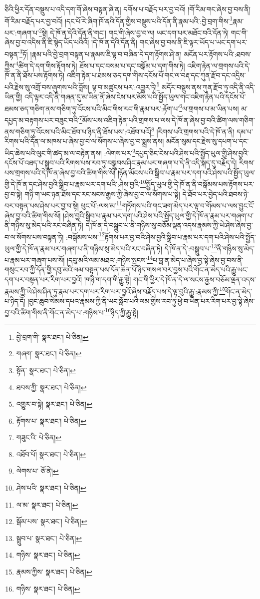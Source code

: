 ཅིའི་ཕྱིར་དོན་བསྡུས་པ་འདི་དག་གོ་ཞེས་བསྟན་ཞེ་ན། དགོས་པ་བརྗོད་པར་བྱ་བའོ། །གོ་རིམ་གང་ཞེས་བྱ་བས་ནི། གོ་རིམ་བརྗོད་པར་བྱ་བའོ། །དང་པོ་རེ་ཞིག་ཁོ་ནའི་དོན་གྱིས་བསྡུས་པའི་དོན་ནི་རྣམ་པའི་:བྱེ་བྲག་གིས་\footnote{བྱེ་བྲག་གི་  སྣར་ཐང་།  པེ་ཅིན། }རྣམ་པར་:གཞག་པ་\footnote{གཞག་  སྣར་ཐང་།  པེ་ཅིན། }སྟེ། དེ་ཁོ་ན་དེའི་དོན་ནི་གང་། གང་གི་ཞེས་བྱ་བ་ལ། ཡང་དག་པར་མཐོང་བའི་དོན་ཏེ། གང་གི་ཞེས་བྱ་བ་འདིས་ནི་ཇི་སྙེད་ཡོད་པའིའོ། །དེ་ཁོ་ན་དེའི་དོན་ནི། གང་ཞེས་བྱ་བས་ནི་ཇི་ལྟར་ཡོད་པ་ཡང་དག་པར་བསྟན་\footnote{སྟོན་  སྣར་ཐང་།  པེ་ཅིན། }ཏོ། །རྣམ་པའི་བྱེ་བྲག་བསྟན་པ་རྣམས་ཇི་ལྟ་བ་བཞིན་དེ་དག་རྟོགས་ཤེ་ན། མངོན་པར་རྟོགས་པའི་:ཐབས་ཀྱིས་\footnote{ཐབས་ཀྱི་  སྣར་ཐང་།  པེ་ཅིན། }ཚིག་དེ་དག་གིས་རྟོགས་ཏེ། ཐོས་པ་དང་བསམ་པ་དང་བསྒོམ་པ་དག་གིས་ཏེ། འཇིག་རྟེན་ལ་གྲགས་པའི་དེ་ཁོ་ན་ནི་ཐོས་པས་རྟོགས་ཏེ། འཇིག་རྟེན་པ་ཐམས་ཅད་དག་གིས་དངོས་པོ་གང་ལ་བརྡ་དང་ཀུན་རྫོབ་དང་འདྲིས་པའི་རྗེས་སུ་འགྲོ་བས་ཞུགས་པའི་བློས། ལྟ་བ་མཚུངས་པར་:འགྱུར་ཏེ།\footnote{འགྱུར་བ་སྟེ།  སྣར་ཐང་།  པེ་ཅིན། } མདོར་བསྡུས་ནས་ཀུན་རྫོབ་ཏུ་འདི་ནི་འདི་ཡིན་གྱི། འདི་ལྟར་འདི་ནི་གཞན་དུ་མ་ཡིན་ནོ་ཞེས་ངེས་པར་མོས་པའི་སྤྱོད་ཡུལ་གང་འཇིག་རྟེན་པའི་དངོས་པོ་ཐམས་ཅད་གཅིག་ནས་གཅིག་ཏུ་འོངས་པའི་མིང་གིས་རང་གི་རྣམ་པར་:རྟོག་པ་\footnote{རྟོགས་པ་  སྣར་ཐང་།  པེ་ཅིན། }ལ་གྲགས་པ་མ་ཡིན་པས། མ་དཔྱད་མ་བརྟགས་པར་བཟུང་བའི་\footnote{གཟུང་འི་  པེ་ཅིན། }མོས་པས་འཇིག་རྟེན་པའི་གྲགས་པ་ལས་དེ་ཁོ་ན་ཞེས་བྱ་བའི་ཚིག་ལས་གཅིག་ནས་གཅིག་ཏུ་འོངས་པའི་མིང་ཐོབ་པ་ཉིད་ནི་ཐོས་པས་:འཐོབ་པའོ།\footnote{འཐོབ་པོ།  སྣར་ཐང་།  པེ་ཅིན། } །རིགས་པའི་གྲགས་པའི་དེ་ཁོ་ན་ནི། དམ་པ་རིགས་པའི་དོན་ལ་མཁས་པ་ཞེས་བྱ་བ་ལ་སོགས་པ་ཞེས་བྱ་བ་སྨྲས་ནས། མངོན་སུམ་དང་རྗེས་སུ་དཔག་པ་དང་ཡིད་ཆེས་པའི་ལུང་གི་ཚད་མ་ལ་བརྟེན་ནས། :ལེགས་པར་\footnote{ལེགས་པ་  ཅོ་ནེ། }དཔྱད་ཅིང་ངེས་པའི་ཤེས་པའི་སྤྱོད་ཡུལ་གྱི་ཤེས་བྱའི་དངོས་པོ་འཐད་པ་སྒྲུབ་པའི་རིགས་པས་རབ་ཏུ་བསྒྲུབས་ཤིང་རྣམ་པར་གཞག་པ་དེ་ནི་འདི་སྐད་དུ་བརྗོད་དེ། རིགས་པས་གྲགས་པའི་དེ་ཁོ་ན་ཞེས་བྱ་བའི་ཚིག་གིས་སོ། །ཉོན་མོངས་པའི་སྒྲིབ་པ་རྣམ་པར་དག་པའི་ཤེས་པའི་སྤྱོད་ཡུལ་གྱི་དེ་ཁོ་ན་དང་ཤེས་བྱའི་སྒྲིབ་པ་རྣམ་པར་དག་པའི་:ཤེས་བྱའི་\footnote{ཤེས་པའི་  སྣར་ཐང་།  པེ་ཅིན། }སྤྱོད་ཡུལ་གྱི་དེ་ཁོ་ན་ནི་བསྒོམས་པས་རྟོགས་པར་བྱ་བ་སྟེ། གཉི་ག་ཡང་ཉན་ཐོས་དང་རང་སངས་རྒྱས་ཀྱི་ཞེས་བྱ་བ་ལ་སོགས་པ་སྟེ། དེ་ཐོབ་པར་བྱེད་པའི་ཐབས་ཉེ་བར་བསྟན་པས་ཤེས་པར་བྱ་བ་སྟེ། ཕུང་པོ་:ལས་མ་\footnote{ལ་མ་  སྣར་ཐང་།  པེ་ཅིན། }གཏོགས་པའི་གང་ཟག་མེད་པར་ལྟ་བ་གོམས་པ་ལས་བྱུང་ངོ་ཞེས་བྱ་བའི་ཚིག་གིས་སོ། །ཤེས་བྱའི་སྒྲིབ་པ་རྣམ་པར་དག་པའི་ཤེས་པའི་སྤྱོད་ཡུལ་གྱི་དེ་ཁོ་ན་རྣམ་པར་གཞག་པ་ནི་གཉིས་སུ་མེད་པའི་རང་བཞིན་ཏེ། དེ་ཁོ་ན་དེ་བསྒྲུབ་པ་ནི་གཉིས་སུ་བཅོམ་ལྡན་འདས་རྣམས་ཀྱི་ཡེ་ཤེས་ཞེས་བྱ་བ་ལ་སོགས་པས་བསྟན་ཏེ། :བསྒོམས་པས་\footnote{སྒོམ་པས་  སྣར་ཐང་།  པེ་ཅིན། }རྟོགས་པར་བྱ་བའི་ཤེས་བྱའི་སྒྲིབ་པ་རྣམ་པར་དག་པའི་ཤེས་པའི་སྤྱོད་ཡུལ་གྱི་དེ་ཁོ་ན་རྣམ་པར་གཞག་པ་ནི་གཉིས་སུ་མེད་པའི་རང་བཞིན་ཏེ། དེ་ཁོ་ན་དེ་:བསྒྲུབ་པ་\footnote{སྒྲུབ་པ་  སྣར་ཐང་།  པེ་ཅིན། }ནི་གཉིས་སུ་མེད་པ་རྣམ་པར་གཞག་པས་སོ། །དབུ་མའི་ལམ་མཐའ་:གཉིས་སྤངས་\footnote{གཉིས་  སྣར་ཐང་།  པེ་ཅིན། }པ་བླ་ན་མེད་པ་ཞེས་བྱ་སྟེ་ཞེས་བྱ་བས་ནི་གསུང་རབ་ཀྱི་དོན་གྱི་དབུ་མའི་ལམ་བསྟན་པས་དོན་ཆེན་པོ་ཉིད་གསལ་བར་བྱས་པའི་གོང་ན་མེད་པའི་རྒྱུ་ཡང་དག་པར་བསྟན་པར་རིག་པར་བྱའོ། །གཉི་ག་དག་གི་རྒྱུ་སྟེ། གང་གི་ཕྱིར་དེ་ཁོ་ན་དེ་ལ་སངས་རྒྱས་བཅོམ་ལྡན་འདས་རྣམས་ཀྱི་ཡེ་ཤེས་ཤིན་ཏུ་རྣམ་པར་དག་པར་རིག་པར་བྱའོ་ཞེས་བརྗོད་པས་དེ་ལྟ་བུའི་རྒྱུ་:རྣམས་ཀྱི་\footnote{རྣམས་ཀྱིས་  སྣར་ཐང་།  པེ་ཅིན། }གོང་ན་མེད་པ་ཉིད་དོ། །བྱང་ཆུབ་སེམས་དཔའ་རྣམས་ཀྱི་ནི་ཡང་སློབ་པའི་ལམ་གྱིས་རབ་ཏུ་ཕྱེ་བ་ཡིན་པར་རིག་པར་བྱ་སྟེ་ཞེས་བྱ་བའི་ཚིག་གིས་ནི་གོང་ན་མེད་པ་:གཉིས་པ་\footnote{གཉིས་  སྣར་ཐང་།  པེ་ཅིན། }ཉིད་ཀྱི་རྒྱུ་སྟེ། 